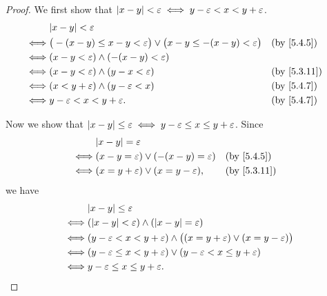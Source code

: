 \begin{proof}
  We first show that \(\left\lvert x - y\right\rvert < \varepsilon \iff y - \varepsilon < x < y + \varepsilon\).
  \begin{align*}
         & \abs{x - y} < \varepsilon                                                                                                   \\
    \iff & \big(-(x - y) \leq x - y < \varepsilon\big) \lor \big(x - y \leq -(x - y) < \varepsilon\big) &  & \text{(by \cref{5.4.5})}  \\
    \iff & (x - y < \varepsilon) \land (-(x - y) < \varepsilon)                                                                        \\
    \iff & (x - y < \varepsilon) \land (y - x < \varepsilon)                                            &  & \text{(by \cref{5.3.11})} \\
    \iff & (x < y + \varepsilon) \land (y - \varepsilon < x)                                            &  & \text{(by \cref{5.4.7})}  \\
    \iff & y - \varepsilon < x < y + \varepsilon.                                                       &  & \text{(by \cref{5.4.7})}
  \end{align*}

  Now we show that \(\left\lvert x - y\right\rvert \leq \varepsilon \iff y - \varepsilon \leq x \leq y + \varepsilon\).
  Since
  \begin{align*}
         & \abs{x - y} = \varepsilon                                                          \\
    \iff & (x - y = \varepsilon) \lor (-(x - y) = \varepsilon) &  & \text{(by \cref{5.4.5})}  \\
    \iff & (x = y + \varepsilon) \lor (x = y - \varepsilon),   &  & \text{(by \cref{5.3.11})}
  \end{align*}
  we have
  \begin{align*}
         & \abs{x - y} \leq \varepsilon                                                                             \\
    \iff & (\abs{x - y} < \varepsilon) \land (\abs{x - y} = \varepsilon)                                            \\
    \iff & (y - \varepsilon < x < y + \varepsilon) \land \big((x = y + \varepsilon) \lor (x = y - \varepsilon)\big) \\
    \iff & (y - \varepsilon \leq x < y + \varepsilon) \lor (y - \varepsilon < x \leq y + \varepsilon)               \\
    \iff & y - \varepsilon \leq x \leq y + \varepsilon.
  \end{align*}
\end{proof}

